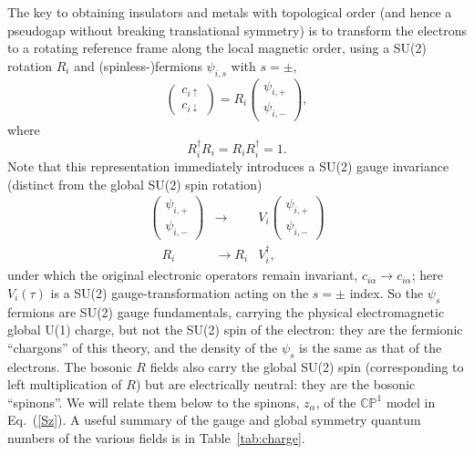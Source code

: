 \documentclass[aps,prb,preprint,onecolumn,citeautoscript,superscriptaddress,footinbib,
eqsecnum]{revtex4-1}
\newcommand{\beq}{\begin{equation}}
\newcommand{\eeq}{\end{equation}}
\def\bea{\begin{eqnarray}}
\def\eea{\end{eqnarray}}
\begin{document}
The key to obtaining insulators and metals with topological order (and hence a pseudogap without breaking translational symmetry)
is to transform the electrons to a rotating reference frame \cite{SS09,DCSS15b,DCSS16,2016PhRvB..94k5147S}
along the local magnetic order, using a SU(2) rotation $R_i$ and (spinless-)fermions 
$\psi_{i,s}$ with $s= \pm$,
\beq
\left( \begin{array}{c} c_{i\uparrow} \\ c_{i\downarrow} \end{array} \right) = R_i \left( \begin{array}{c} \psi_{i,+} \\ \psi_{i,-} \end{array} \right),
\label{R}
\eeq
where 
\beq
R_i^\dagger R_i = R_i R_i^\dagger = 1. 
\eeq
Note that this representation immediately introduces a SU(2) gauge invariance (distinct from the global SU(2) spin rotation)
\bea
\left( \begin{array}{c} \psi_{i,+} \\ \psi_{i,-} \end{array} \right) &\rightarrow& V_i \left( \begin{array}{c} \psi_{i,+} \\ \psi_{i,-} \end{array} \right) \label{gauge1} \\
\quad R_i &\rightarrow R_i& V_i^\dagger , \label{gauge2}
\eea
under which the original electronic operators remain invariant, $c_{i\alpha}\rightarrow c_{i\alpha}$; here $V_i (\tau) $ is a  SU(2) gauge-transformation acting on the $s=\pm$ index. So the $\psi_s$ fermions are SU(2) gauge fundamentals, carrying 
the physical electromagnetic global U(1) charge, but not the SU(2) spin of the electron: they are the fermionic  
``chargons'' of this theory, and  the density of the $\psi_s$ is the same as that of the electrons.
The bosonic $R$ fields also carry the global SU(2) spin (corresponding to left multiplication of $R$) but are electrically neutral:
they are the bosonic ``spinons''. We will relate them below to the spinons, $z_\alpha$, of the $\mathbb{CP}^1$ model in Eq.~(\ref{Sz}).
A useful summary of the gauge and global symmetry quantum numbers of the various fields is in Table~\ref{tab:charge}.
\end{document}
